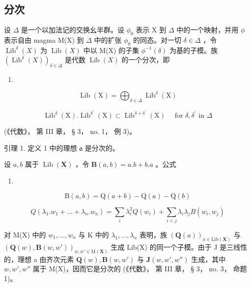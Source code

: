 \subsection{分次}

设 \(\Delta\) 是一个以加法记的交换幺半群。设 \(\phi_0\) 表示 X 到 \(\Delta\) 中的一个映射，并用 \(\phi\) 表示自由 magma M(X) 到 \(\Delta\) 中的扩张 \(\phi_0\) 的同态。对一切 \(\delta \in \Delta\) ，令 \(\operatorname{Lib}^{\delta}(X)\) 为 \(\operatorname{Lib}(X)\) 中以 M(X) 的子集 \(\phi^{-1}(\delta)\) 为基的子模。族 \((\operatorname{Lib}^{\delta}(X))_{\delta \in \Delta}\) 是代数 \(\operatorname{Lib}(X)\) 的一个分次，即

\begin{enumerate}
\def\labelenumi{(\arabic{enumi})}
\setcounter{enumi}{7}
\tightlist
\item
\end{enumerate}

\[
\operatorname{Lib} (\mathrm{X}) = \bigoplus_ {\delta \in \Delta} \operatorname{Lib} ^ {\delta} (\mathrm{X})\tag{8}
\]

\[
\operatorname{Lib} ^ {\delta} (\mathrm{X}). \operatorname{Lib} ^ {\delta^ {\prime}} (\mathrm{X}) \subset \operatorname{Lib} ^ {\delta + \delta^ {\prime}} (\mathrm{X}) \quad \text { for } \delta , \delta^ {\prime} \text { in } \Delta\tag{9}
\]

(《代数》， 第 III 章， § 3， no. 1， 例 3)。

引理 1. 定义 1 中的理想 \(\mathfrak{a}\) 是分次的。

设 \(a, b\) 属于 \(\operatorname{Lib}(\mathbf{X})\) ，令 \(\mathbf{B}(a, b) = a.b + b.a\) 。公式

\begin{enumerate}
\def\labelenumi{(\arabic{enumi})}
\setcounter{enumi}{9}
\tightlist
\item
\end{enumerate}

\[
\mathrm{B} (a, b) = \mathrm{Q} (a + b) - \mathrm{Q} (a) - \mathrm{Q} (b)\tag{10}
\]

\[
Q \left(\lambda_ {1}. w _ {1} + \dots + \lambda_ {n}. w _ {n}\right) = \sum_ {i} \lambda_ {i} ^ {2} Q \left(w _ {i}\right) + \sum_ {i <   j} \lambda_ {i} \lambda_ {j} B \left(w _ {i}, w _ {j}\right)\tag{11}
\]

对 M(X) 中的 \(w_1, \ldots, w_n\) 与 K 中的 \(\lambda_1, \ldots, \lambda_n\) 表明，族 \((\mathbf{Q}(a))_{a \in \mathrm{Lib}(\mathbf{X})}\) 与 \((\mathbf{Q}(w), \mathbf{B}(w, w'))_{w, w' \in \mathrm{M}(\mathbf{X})}\) 生成 Lib(X) 的同一个子模。由于 J 是三线性的，理想 a 由齐次元素 \(\mathbf{Q}(w), \mathbf{B}(w, w')\) 与 \(\mathbf{J}(w, w', w'')\) 生成，其中 \(w, w', w''\) 属于 M(X)，因而它是分次的 (《代数》， 第 III 章， § 3， no. 3， 命题 1)。

